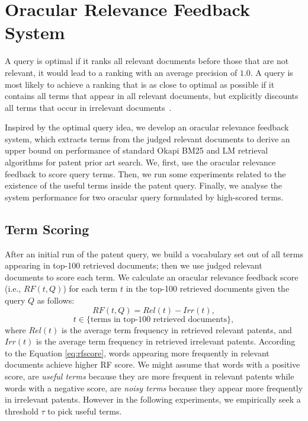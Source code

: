 \section{Oracular Relevance Feedback System}
\label{sec:oraculrquery}
A query is optimal if it ranks all relevant documents before
those that are not relevant, it would lead to a ranking with an average precision of $1.0$. A query
is most likely to achieve a ranking that is as close to optimal as possible if it contains all terms that
appear in all relevant documents, but explicitly discounts all terms that occur in irrelevant documents~\citep{manning2008introduction}.

Inspired by the optimal query idea, we develop an oracular relevance feedback system, which
extracts terms from the judged relevant documents to derive an upper bound on performance of
standard Okapi BM25 and LM retrieval
algorithms for patent prior art search.
We, first, use the oracular relevance feedback to score query terms. 
Then, we run some experiments related to the existence of the useful terms inside the patent query.   
Finally, we analyse the system performance for two oracular query formulated by high-scored terms. 
\subsection{Term Scoring}
\label{OracularTermSelection}
After an initial run of the patent query, we build a vocabulary set out of all terms appearing in top-100 retrieved documents; then we use judged relevant documents to score each term. 
We calculate an oracular relevance feedback score (i.e., $RF(t,Q)$) for each term $t$ in the top-100
retrieved documents given the query $Q$ as follows:
\begin{equation}
RF(t,Q)=Rel(t)-Irr(t), 
 \label{eq:rfscore}
\end{equation}
\begin{displaymath}t\in \lbrace \mbox{terms in top-100 retrieved documents}\rbrace,\end{displaymath}
where $ \mathit{Rel(t)} $ is the average term frequency in retrieved relevant patents, and $ \mathit{Irr(t)} $ is the average term frequency in retrieved irrelevant patents. According to the Equation \ref{eq:rfscore}, words appearing more frequently in relevant documents achieve higher RF score. We might assume that words with a positive score, are \textit{useful terms} because they are more frequent in relevant patents while words with a negative score, are \textit{noisy terms} because they appear more frequently in irrelevant patents. However in the following experiments, we empirically seek a threshold $\tau$ to pick useful terms. 

